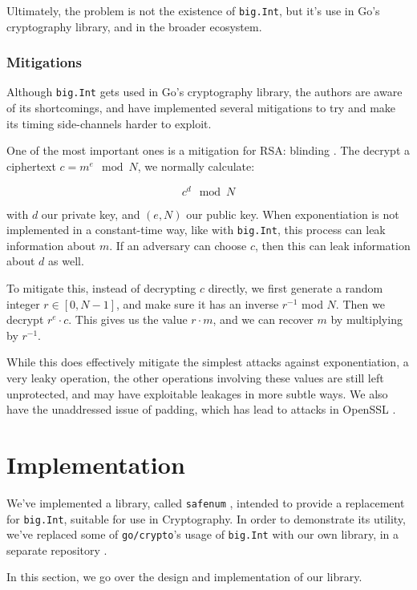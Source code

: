 \documentclass[11pt, a4paper]{article} %
\begin{document}
{Ultimately, the problem is not the existence of \texttt{big.Int},
but it's use in Go's cryptography library, and in the broader ecosystem.

\subsubsection{Mitigations}

Although \texttt{big.Int} gets used in Go's cryptography library,
the authors are aware of its shortcomings, and have implemented
several mitigations to try and make its timing side-channels harder to
exploit.

One of the most important ones is a mitigation
for RSA: blinding \cite{kocher_timing_1996}. The decrypt a ciphertext
$c = m^e \mod N$, we normally calculate:

$$
c^d \mod N
$$

with $d$ our private key, and $(e, N)$ our public key.
When exponentiation is not implemented in a constant-time way, like
with \texttt{big.Int}, this process can leak information about $m$.
If an adversary can choose $c$, then this can leak information about
$d$ as well.

To mitigate this, instead of decrypting $c$ directly,
we first generate a random integer
$r \in [0, N - 1]$, and make sure
it has an inverse $r^{-1}$ mod $N$. Then we decrypt $r^e \cdot c$.
This gives us the value $r \cdot m$, and we can recover
$m$ by multiplying by $r^{-1}$.

While this does effectively mitigate the simplest attacks
against exponentiation, a very leaky operation, the other operations
involving these values are still left unprotected, and may
have exploitable leakages in more subtle ways. We also have
the unaddressed issue of padding, which has lead to attacks
in OpenSSL \cite{merget_raccoon_2019}.

\section{Implementation}

We've implemented a library, called
\texttt{safenum} \cite{meier_cronokirbysafenum_2021}, intended to provide
a replacement for \texttt{big.Int}, suitable for use in Cryptography.
In order to demonstrate its utility, we've replaced some
of \texttt{go/crypto}'s usage of \texttt{big.Int} with our own library,
in a separate repository
\cite{meier_cronokirbyctcrypto_2021}.

In this section, we go over the design and implementation of our
library.

}
\end{document}

